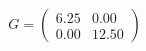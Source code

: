 \documentclass[preview]{standalone}
\begin{document}
\begin{align*}
G = \begin{pmatrix} 6.25 & 0.00 \\ 0.00 & 12.50 \end{pmatrix}
\end{align*}
\end{document}
